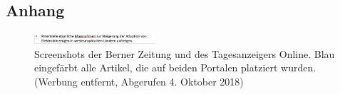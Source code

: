 \documentclass[a4paper,12pt,bibliography=totoc,numbers=noenddot]{scrartcl}\usepackage[]{graphicx}\usepackage[]{color}
\begin{document}


%

%

\newpage
\tableofcontents
\newpage
\newpage
\listoffigures



\newpage
{}


\newpage
{}
\newpage





\newpage
\setlength{\bibitemsep}{.45\baselineskip}
\printbibliography
%
%
\begin{appendices}
%
\newpage
\section{Anhang}
\begin{figure}[h]
    \centering
    \includegraphics[width=0.4\textwidth]{figure/merge.png}
    \caption{Screenshots der Berner Zeitung und des Tagesanzeigers Online. Blau eingefärbt alle Artikel, die auf beiden Portalen platziert wurden. (Werbung entfernt, Abgerufen 4. Oktober 2018)}
    \label{}
\end{figure}

\end{appendices}


\end{document}
